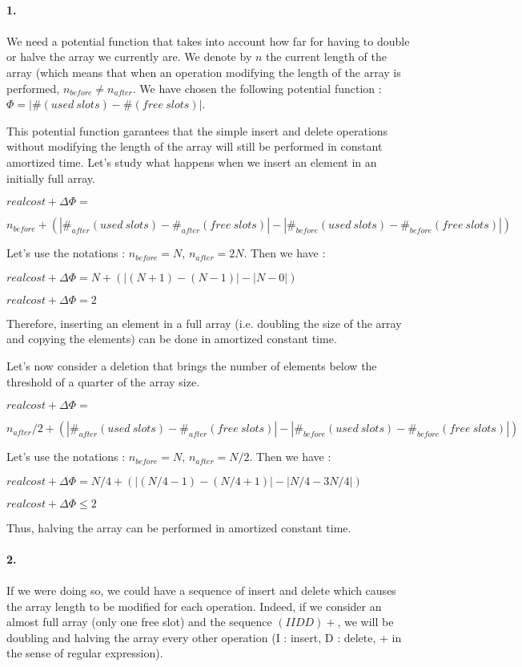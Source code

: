 \paragraph{1.}

\paragraph{}
We need a potential function that takes into account how far for having to double or halve the array we currently are. We denote by $n$ the current length of the array (which means that when an operation modifying the length of the array is performed, $n_{before} \neq n_{after}$. We have chosen the following potential function : $\Phi =  |\# (used\ slots) - \# (free\ slots)|$.

This potential function garantees that the simple insert and delete operations without modifying the length of the array will still be performed in constant amortized time. Let's study what happens when we insert an element in an initially full array.

$real cost + \Delta\Phi =$

$ n_{before}  +(|\#_{after} (used\ slots)-\#_{after} (free\ slots)|-|\#_{before} (used\ slots)-\#_{before} (free\ slots)|)$

Let's use the notations : $n_{before} = N$, $n_{after} = 2N$. Then we have :

$real cost + \Delta\Phi = N +(|(N+1)-(N-1)|-|N-0|)$

$real cost + \Delta\Phi = 2$

Therefore, inserting an element in a full array (i.e. doubling the size of the array and copying the elements) can be done in amortized constant time.

Let's now consider a deletion that brings the number of elements below the threshold of a quarter of the array size.

$real cost + \Delta\Phi =$

$ n_{after}/2  +(|\#_{after} (used\ slots)-\#_{after} (free\ slots)|-|\#_{before} (used\ slots)-\#_{before} (free\ slots)|)$


Let's use the notations : $n_{before} = N$, $n_{after} = N/2$. Then we have :

$real cost + \Delta\Phi = N/4+ (|(N/4-1)-(N/4+1)|-|N/4-3N/4|)$

$real cost + \Delta\Phi \leqslant 2 $

Thus, halving the array can be performed in amortized constant time.

\paragraph{2.}

\paragraph{}

If we were doing so, we could have a sequence of insert and delete which causes the array length to be modified for each operation. Indeed, if we consider an almost full array (only one free slot) and the sequence  $(IIDD)+$, we will be doubling and halving the array every other operation (I : insert, D : delete, + in the sense of regular expression).